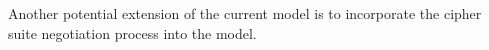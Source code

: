 \documentclass[runningheads, envcountsame, a4paper, draft, x11names]{llncs}
\begin{document}
Another potential extension of the current model is to incorporate the cipher suite negotiation process into the model.\\ 
%




%
% 
%
% 
\end{document}
